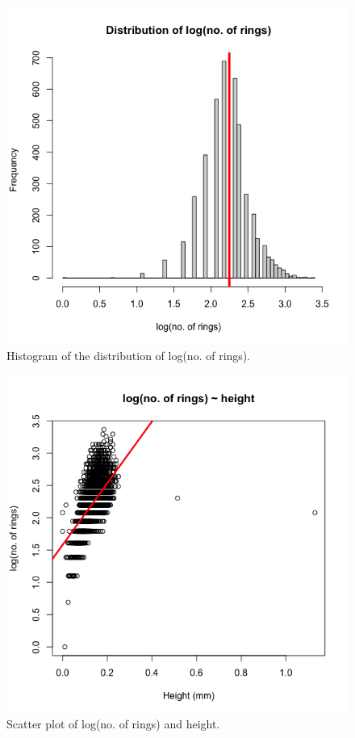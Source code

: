 \documentclass[11pt,letterpaper]{article}
\begin{document}
	\begin{figure}
		\centering
		\includegraphics[height=0.4\textheight]{2-rings-log}
		\caption{Histogram of the distribution of log(no. of rings).}
		\label{fig:rings-log}
	\end{figure}

	\begin{figure}
		\centering
		\includegraphics[height=0.4\textheight]{2-log}
		\caption{Scatter plot of log(no. of rings) and height.}
		\label{fig:scatter-log}
	\end{figure}
	
\end{document}
